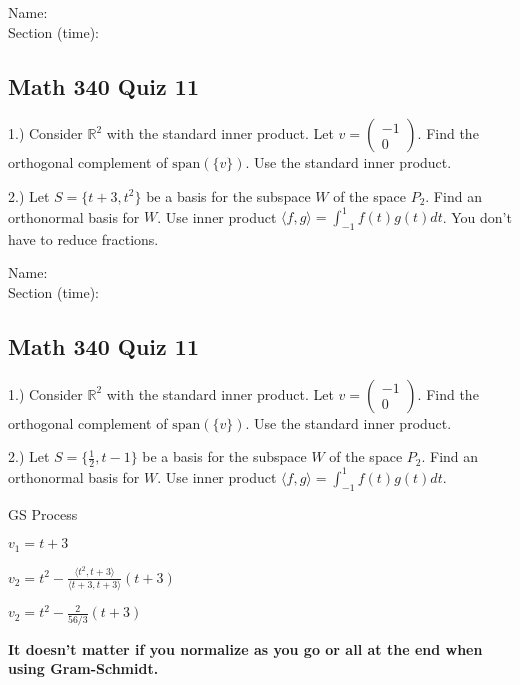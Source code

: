 \documentclass{article}
\begin{document}
Name:\\
\medskip
Section (time):

\subsection*{Math 340 Quiz 11}


1.) Consider $\mathbb{R}^2$ with the standard inner product. Let $v= \left( \begin{array}{c}

-1\\
0
\end{array} \right)$. Find the orthogonal complement of $\text{span}\left( \{v\} \right)$. Use the standard inner product.
\smallskip


2.) Let $S=\{t+3, t^2\}$ be a basis for the subspace $W$ of the space $P_2$. Find an orthonormal basis for $W$. Use inner product $\langle f, g\rangle = \int_{-1}^1 f(t)g(t) dt$. You don't have to reduce fractions. 


\pagebreak
Name:\\
\medskip
Section (time):

\subsection*{Math 340 Quiz 11}


1.) Consider $\mathbb{R}^2$ with the standard inner product. Let $v= \left( \begin{array}{c}

-1\\
0
\end{array} \right)$. Find the orthogonal complement of $\text{span}\left( \{v\} \right)$. Use the standard inner product.
\smallskip


2.) Let $S=\{\frac{1}{2}, t-1\}$ be a basis for the subspace $W$ of the space $P_2$. Find an orthonormal basis for $W$. Use inner product $\langle f, g\rangle = \int_{-1}^1 f(t)g(t) dt$.


\pagebreak

GS Process

$v_1 = t+3$

$v_2 = t^2 - \frac{\langle t^2, t+3 \rangle }{\langle t+3, t+3 \rangle} (t+3)$


$v_2 = t^2 - \frac{2}{56/3}(t+3)$


\pagebreak
\textbf{It doesn't matter if you normalize as you go or all at the end when using Gram-Schmidt.}
\end{document}
